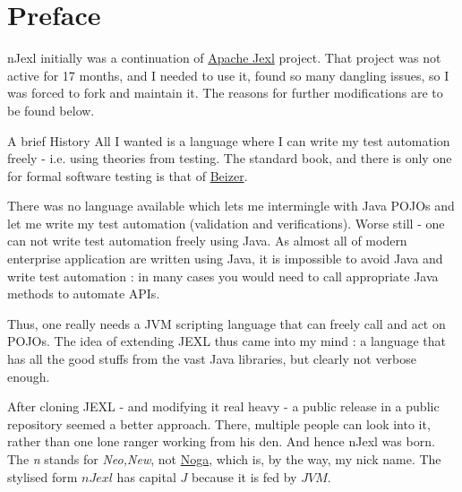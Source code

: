 \chapter{Preface}
 
{\LARGE nJexl} initially was a continuation of \href{http://commons.apache.org/proper/commons-jexl}{Apache Jexl} project.
That project was not active for 17 months, and I needed to use it, found so many dangling issues, 
so I was forced to fork and maintain it. The reasons for further modifications are to be found below.

\begin{subsection}{A brief History}
All I wanted is a language where I can write my test automation freely - i.e. using theories from testing.
The standard book, and there is only one for formal software testing is 
that of \href{http://www.amazon.com/Software-Testing-Techniques-2nd-Edition/dp/1850328803}{Beizer}.

There was no language available which lets me intermingle with Java POJOs and let me write my test automation (validation and verifications). 
Worse still - one can not write test automation freely using Java. 
As almost all of modern enterprise application are written using Java, it is impossible to avoid Java 
and write test automation : in many cases you would need to call appropriate Java methods to automate APIs.

Thus, one really needs a JVM scripting language that can freely call and act on POJOs.
The idea of extending JEXL thus came into my mind : a language that has all the good stuffs from
the vast Java libraries, but clearly not verbose enough.

After cloning JEXL - and modifying it real heavy - a public release in a public repository
seemed a better approach. There, multiple people can look into it, rather than one lone ranger working from his den.
And hence nJexl was born. The \emph{n} stands for \emph{Neo,New}, 
not \href{https://nmandalh.wordpress.com}{Noga}, which is, by the way, my nick name.
The stylised form $nJexl$ has capital $J$ because it is fed by $JVM$.

\end{subsection}


